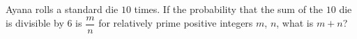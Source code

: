 Ayana rolls a standard die $10$ times. If the probability that the sum of the $10$ die is divisible by $6$ is $\dfrac{m}{n}$ for relatively prime positive integers $m$, $n$, what is $m + n$?
